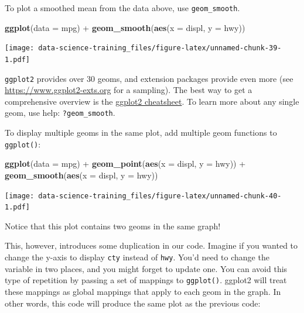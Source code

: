 \documentclass[]{book}
\newenvironment{Shaded}{\begin{snugshade}}{\end{snugshade}}
\newcommand{\KeywordTok}[1]{\textcolor[rgb]{0.13,0.29,0.53}{\textbf{{#1}}}}
\newcommand{\DataTypeTok}[1]{\textcolor[rgb]{0.13,0.29,0.53}{{#1}}}
\newcommand{\StringTok}[1]{\textcolor[rgb]{0.31,0.60,0.02}{{#1}}}
\newcommand{\NormalTok}[1]{{#1}}
\theoremstyle{definition}
\theoremstyle{definition}
\theoremstyle{definition}
\theoremstyle{remark}
\begin{document}
To plot a smoothed mean from the data above, use \texttt{geom\_smooth}.

\begin{Shaded}
\begin{Highlighting}[]
\KeywordTok{ggplot}\NormalTok{(}\DataTypeTok{data =} \NormalTok{mpg) +}\StringTok{ }
\StringTok{  }\KeywordTok{geom_smooth}\NormalTok{(}\KeywordTok{aes}\NormalTok{(}\DataTypeTok{x =} \NormalTok{displ, }\DataTypeTok{y =} \NormalTok{hwy))}
\end{Highlighting}
\end{Shaded}

\texttt{[image: data-science-training\_files/figure-latex/unnamed-chunk-39-1.pdf]}

\texttt{ggplot2} provides over 30 geoms, and extension packages provide
even more (see \url{https://www.ggplot2-exts.org} for a sampling). The
best way to get a comprehensive overview is the
\href{http://rstudio.com/cheatsheets}{ggplot2 cheatsheet}. To learn more
about any single geom, use help: \texttt{?geom\_smooth}.

To display multiple geoms in the same plot, add multiple geom functions
to \texttt{ggplot()}:

\begin{Shaded}
\begin{Highlighting}[]
\KeywordTok{ggplot}\NormalTok{(}\DataTypeTok{data =} \NormalTok{mpg) +}\StringTok{ }
\StringTok{  }\KeywordTok{geom_point}\NormalTok{(}\KeywordTok{aes}\NormalTok{(}\DataTypeTok{x =} \NormalTok{displ, }\DataTypeTok{y =} \NormalTok{hwy)) +}
\StringTok{  }\KeywordTok{geom_smooth}\NormalTok{(}\KeywordTok{aes}\NormalTok{(}\DataTypeTok{x =} \NormalTok{displ, }\DataTypeTok{y =} \NormalTok{hwy))}
\end{Highlighting}
\end{Shaded}

\texttt{[image: data-science-training\_files/figure-latex/unnamed-chunk-40-1.pdf]}

Notice that this plot contains two geoms in the same graph!

This, however, introduces some duplication in our code. Imagine if you
wanted to change the y-axis to display \texttt{cty} instead of
\texttt{hwy}. You'd need to change the variable in two places, and you
might forget to update one. You can avoid this type of repetition by
passing a set of mappings to \texttt{ggplot()}. ggplot2 will treat these
mappings as global mappings that apply to each geom in the graph. In
other words, this code will produce the same plot as the previous code:
\end{document}

